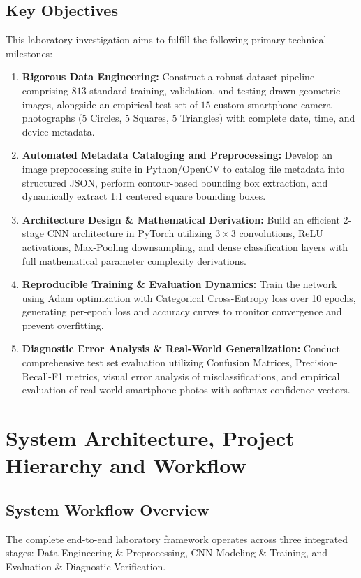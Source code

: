 \documentclass[11pt,a4paper,oneside]{report}
\begin{document}
\section{Key Objectives}
This laboratory investigation aims to fulfill the following primary technical milestones:
\begin{enumerate}[leftmargin=*]
    \item \textbf{Rigorous Data Engineering:} Construct a robust dataset pipeline comprising $813$ standard training, validation, and testing drawn geometric images, alongside an empirical test set of $15$ custom smartphone camera photographs (5 Circles, 5 Squares, 5 Triangles) with complete date, time, and device metadata.
    \item \textbf{Automated Metadata Cataloging and Preprocessing:} Develop an image preprocessing suite in Python/OpenCV to catalog file metadata into structured JSON, perform contour-based bounding box extraction, and dynamically extract 1:1 centered square bounding boxes.
    \item \textbf{Architecture Design \& Mathematical Derivation:} Build an efficient 2-stage CNN architecture in PyTorch utilizing $3\times3$ convolutions, ReLU activations, Max-Pooling downsampling, and dense classification layers with full mathematical parameter complexity derivations.
    \item \textbf{Reproducible Training \& Evaluation Dynamics:} Train the network using Adam optimization with Categorical Cross-Entropy loss over 10 epochs, generating per-epoch loss and accuracy curves to monitor convergence and prevent overfitting.
    \item \textbf{Diagnostic Error Analysis \& Real-World Generalization:} Conduct comprehensive test set evaluation utilizing Confusion Matrices, Precision-Recall-F1 metrics, visual error analysis of misclassifications, and empirical evaluation of real-world smartphone photos with softmax confidence vectors.
\end{enumerate}

\chapter{System Architecture, Project Hierarchy and Workflow}

\section{System Workflow Overview}
The complete end-to-end laboratory framework operates across three integrated stages: Data Engineering \& Preprocessing, CNN Modeling \& Training, and Evaluation \& Diagnostic Verification.
\end{document}
